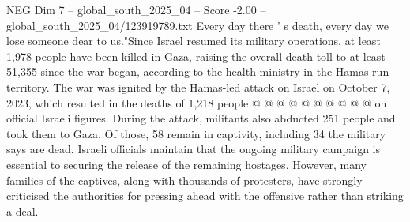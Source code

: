 \begin{textsample}{NEG Dim 7 – global\_south\_2025\_04 – Score -2.00 – global\_south\_2025\_04/123919789.txt}
Every day there ' s death, every day we lose someone dear to us."Since Israel resumed its military operations, at least 1,978 people have been killed in Gaza, raising the overall death toll to at least 51,355 since the war began, according to the health ministry in the Hamas-run territory.
The war was ignited by the Hamas-led attack on Israel on October 7, 2023, which resulted in the deaths of 1,218 people @ @ @ @ @ @ @ @ @ @ on official Israeli figures.
During the attack, militants also abducted 251 people and took them to Gaza.
Of those, 58 remain in captivity, including 34 the military says are dead.
Israeli officials maintain that the ongoing military campaign is essential to securing the release of the remaining hostages.
However, many families of the captives, along with thousands of protesters, have strongly criticised the authorities for pressing ahead with the offensive rather than striking a deal.

\end{textsample}
